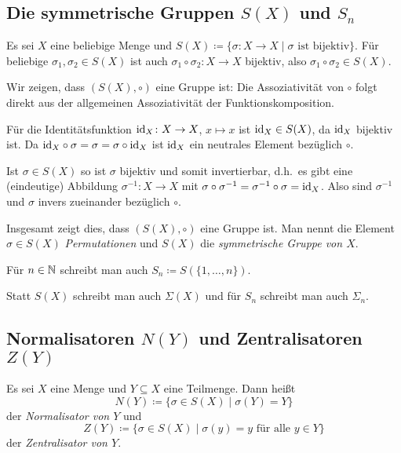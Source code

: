 \subsection{Die symmetrische Gruppen \texorpdfstring{$S(X)$}{S(X)} und \texorpdfstring{$S_n$}{Sn}}
Es sei $X$ eine beliebige Menge und $S(X) \coloneqq \{\sigma \colon X \to X \mid \text{$\sigma$ ist bijektiv}\}$. Für beliebige $\sigma_1, \sigma_2 \in S(X)$ ist auch $\sigma_1 \circ \sigma_2 \colon X \to X$ bijektiv, also $\sigma_1 \circ \sigma_2 \in S(X)$.

Wir zeigen, dass $(S(X), \circ)$ eine Gruppe ist: Die Assoziativität von $\circ$ folgt direkt aus der allgemeinen Assoziativität der Funktionskomposition.

Für die Identitätsfunktion $\mathrm{id}_X \colon X \to X$, $x \mapsto x$ ist $\mathrm{id}_X \in S(X)$, da $\mathrm{id}_X$ bijektiv ist. Da $\mathrm{id}_X \circ \sigma = \sigma = \sigma \circ \mathrm{id}_X$ ist $\mathrm{id}_X$ ein neutrales Element bezüglich $\circ$.

Ist $\sigma \in S(X)$ so ist $\sigma$ bijektiv und somit invertierbar, d.h.\ es gibt eine (eindeutige) Abbildung $\sigma^{-1} \colon X \to X$ mit $\sigma \circ \sigma^{-1} = \sigma^{-1} \circ \sigma = \mathrm{id}_X$. Also sind $\sigma^{-1}$ und $\sigma$ invers zueinander bezüglich $\circ$.

Insgesamt zeigt dies, dass $(S(X), \circ)$ eine Gruppe ist. Man nennt die Element $\sigma \in S(X)$ \emph{Permutationen} und $S(X)$ die \emph{symmetrische Gruppe von $X$}.

Für $n \in \mathbb{N}$ schreibt man auch $S_n \coloneqq S(\{1, \dotsc, n\})$.


\begin{bem}
 Statt $S(X)$ schreibt man auch $\Sigma(X)$ und für $S_n$ schreibt man auch $\Sigma_n$.
\end{bem}



\subsection{Normalisatoren \texorpdfstring{$N(Y)$}{N(Y)} und Zentralisatoren \texorpdfstring{$Z(Y)$}{Z(Y)}}
Es sei $X$ eine Menge und $Y \subseteq X$ eine Teilmenge. Dann heißt
\[
 N(Y) \coloneqq \{\sigma \in S(X) \mid \sigma(Y) = Y\}
\]
der \emph{Normalisator von $Y$} und
\[
 Z(Y)
 \coloneqq
 \{\sigma \in S(X) \mid \text{$\sigma(y) = y$ für alle $y \in Y$}\}
\]
der \emph{Zentralisator von $Y$}.

